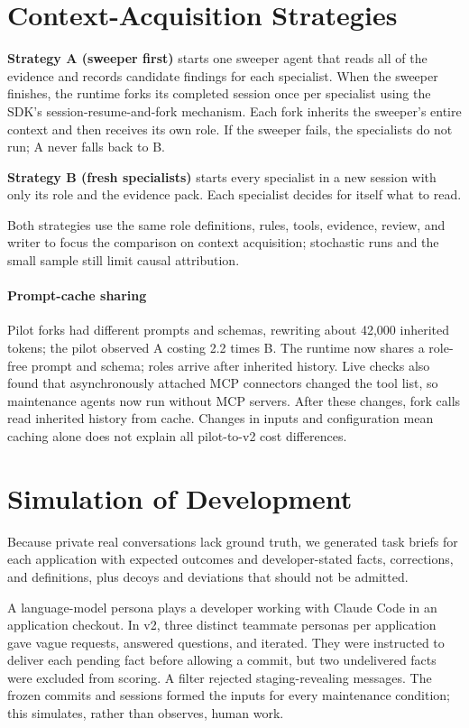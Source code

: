 \section{Context-Acquisition Strategies}
\label{sec:strategies}

\textbf{Strategy A (sweeper first)} starts one sweeper agent that reads all of the evidence and records candidate findings for each specialist. When the sweeper finishes, the runtime forks its completed session once per specialist using the SDK's session-resume-and-fork mechanism. Each fork inherits the sweeper's entire context and then receives its own role. If the sweeper fails, the specialists do not run; A never falls back to B.

\textbf{Strategy B (fresh specialists)} starts every specialist in a new session with only its role and the evidence pack. Each specialist decides for itself what to read.

Both strategies use the same role definitions, rules, tools, evidence, review, and writer to focus the comparison on context acquisition; stochastic runs and the small sample still limit causal attribution.

\paragraph{Prompt-cache sharing} Pilot forks had different prompts and schemas, rewriting about 42{,}000 inherited tokens; the pilot observed A costing 2.2 times B. The runtime now shares a role-free prompt and schema; roles arrive after inherited history. Live checks also found that asynchronously attached MCP connectors changed the tool list, so maintenance agents now run without MCP servers. After these changes, fork calls read inherited history from cache. Changes in inputs and configuration mean caching alone does not explain all pilot-to-v2 cost differences.

\section{Simulation of Development}
\label{sec:simulation}

Because private real conversations lack ground truth, we generated task briefs for each application with expected outcomes and developer-stated facts, corrections, and definitions, plus decoys and deviations that should not be admitted.

A language-model persona plays a developer working with Claude Code in an application checkout. In v2, three distinct teammate personas per application gave vague requests, answered questions, and iterated. They were instructed to deliver each pending fact before allowing a commit, but two undelivered facts were excluded from scoring. A filter rejected staging-revealing messages. The frozen commits and sessions formed the inputs for every maintenance condition; this simulates, rather than observes, human work.

